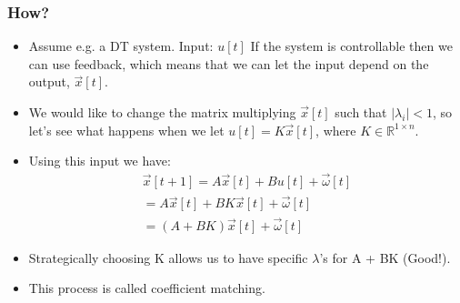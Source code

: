 \documentclass{beamer}
\newcommand{\R}{\mathbb{R}}
\begin{document}
	\begin{frame}
	\frametitle{How?}
	\begin{itemize}
	    \item Assume e.g. a DT system. Input: $u[t]$ If the system is controllable then we can use feedback, which means that we can let the input depend on the output, $\vec{x}[t]$.
	    \item We would like to change the matrix multiplying $\vec{x}[t]$ such that  $|\lambda_i|<1$, so let's see what happens when we let $u[t] = K\vec{x}[t]$, where $K \in \R^{1 \times n}$.
	    \item Using this input we have: 
	    \begin{align*}
	        \vec{x}[t+1] = A\vec{x}[t] + Bu[t] + \vec{\omega}[t]\\
	        = A\vec{x}[t] + BK\vec{x}[t] + \vec{\omega}[t]\\
	        = (A + BK)\vec{x}[t] + \vec{\omega}[t]
	    \end{align*}
	  
	    \item Strategically choosing K allows us to have specific $\lambda$'s for A + BK (Good!).
	    \item This process is called coefficient matching. 
	\end{itemize}
	\end{frame}
\end{document}
